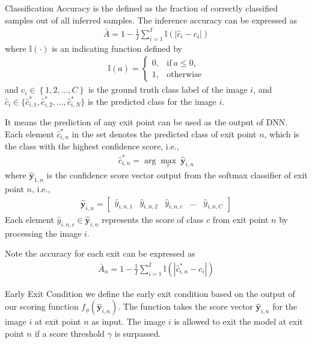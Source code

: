\begin{enumdescript}
	\item[Classification Accuracy] is the defined as the fraction of correctly classified samples out of all inferred samples. The inference accuracy can be expressed as
	\begin{align}
	\bar{A}=1-\frac{1}{I} \sum_{i=1}^{I} \mathbb{I}\left(\left|\hat{c}_{i}-c_{i}\right|\right) \label{eq:accuracy}
	\end{align}
	where $ \mathbb{I(\cdot)}  $ is an indicating function defined by
	\begin{align}
	\mathbb{I}(a)= \begin{cases}
	0, & \mathrm{if\:} a \leq 0, \\
	1, & \mathrm{otherwise}
	\end{cases} \label{eq:indicator}
	\end{align}
	and $ c_i \in \left\{1, 2, \dots, C \right\} $ is the ground truth class label of the image $ i $, and $  \hat{c}_i \in \{\hat{c}^*_{i,1} , \hat{c}^*_{i,2}, \dots, \hat{c}^*_{i,N} \} $ is the predicted class for the image $ i $. 
	
	It means the prediction of any exit point can be used as the output of DNN. Each element $ \hat{c}^*_{i,n} $ in the set denotes the predicted class of exit point $ n $, which is the class with the highest confidence score, i.e.,
	\begin{align}
	\hat{c}^*_{i,n} = \arg \underset{c}{\max}\: \bm{\hat{y}}_{i,n}
	\end{align}
	where $ \bm{\hat{y}}_{1,n} $ is the confidence score vector output from the softmax classifier of exit point $ n $, i.e.,
	\begin{align}
	\bm{\hat{y}}_{i,n} = \left[\begin{array}{ccccc}\hat{y}_{i,n,1} & \hat{y}_{i,n,2} & \hat{y}_{i,n,c} & \dots & \hat{y}_{i,n,C}\end{array}\right]
	\end{align}
	Each element $ \hat{y}_{i,n,c} \in \bm{\hat{y}}_{i,n} $ represents the score of class $ c $ from exit point $ n $ by processing the image $ i $.
	
	Note the accuracy for each exit can be expressed as
	\begin{align}
	\bar{A}_n=1-\frac{1}{I} \sum_{i=1}^{I} \mathbb{I}\left(\left|\hat{c}^*_{i,n}-c_{i}\right|\right)
	\end{align}
	
	\item[Early Exit Condition] we define the early exit condition based on the output of our scoring function $ f_\phi(\bm{\hat{y}}_{i,n}) $. The function takes the score vector $ \bm{\hat{y}}_{i,n} $ for the image $ i $ at exit point $ n $ as input. The image $ i $ is allowed to exit the model at exit point $ n $ if a score threshold $ \gamma $ is surpassed. 
	

\end{enumdescript}
